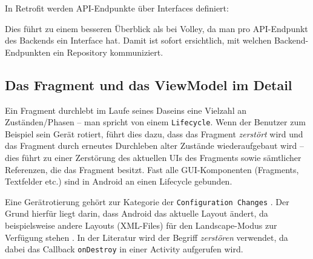 In Retrofit werden API-Endpunkte über Interfaces definiert:

\begin{Shaded}
\begin{Highlighting}[]
 
    \NormalTok{)}
\NormalTok{> }\NormalTok{(}\NormalTok{(}\NormalTok{) }
                         \NormalTok{(}\NormalTok{) }
\NormalTok{\}}
\end{Highlighting}
\end{Shaded}

Dies führt zu einem besseren Überblick als bei Volley, da man pro
API-Endpunkt des Backends ein Interface hat. Damit ist sofort
ersichtlich, mit welchen Backend-Endpunkten ein Repository kommuniziert.

\hypertarget{das-fragment-und-das-viewmodel-im-detail}{%
\subsection{Das Fragment und das ViewModel im
Detail}\label{das-fragment-und-das-viewmodel-im-detail}}

Ein Fragment durchlebt im Laufe seines Daseins eine Vielzahl an
Zuständen/Phasen -- man spricht von einem \texttt{Lifecycle}. Wenn der
Benutzer zum Beispiel sein Gerät rotiert, führt dies dazu, dass das
Fragment \emph{zerstört} wird und das Fragment durch erneutes Durchleben
alter Zustände wiederaufgebaut wird -- dies führt zu einer Zerstörung
des aktuellen UIs des Fragments sowie sämtlicher Referenzen, die das
Fragment besitzt. Fast alle GUI-Komponenten (Fragments, Textfelder etc.)
sind in Android an einen Lifecycle gebunden.

Eine Gerätrotierung gehört zur Kategorie der
\texttt{Configuration\ Changes} \cite{viewmodel}. Der Grund hierfür
liegt darin, dass Android das aktuelle Layout ändert, da beispielsweise
andere Layouts (XML-Files) für den Landscape-Modus zur Verfügung stehen
\cite{configuration-changes}. In der Literatur wird der Begriff
\emph{zerstören} verwendet, da dabei das Callback \texttt{onDestroy} in
einer Activity aufgerufen wird.

